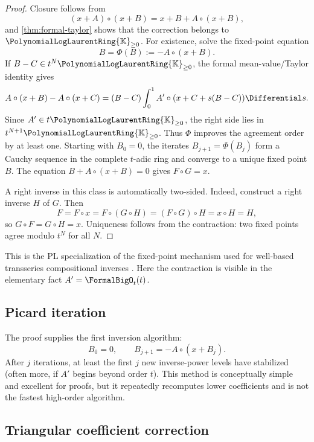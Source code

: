 \documentclass[11pt,oneside]{article}
\numberwithin{equation}{section}
\theoremstyle{definition}
\newcommand{\K}{\mathbb{K}}
\newcommand{\PL}{\PolynomialLogLaurentRing{\K}}
\begin{document}
\begin{proof}
Closure follows from
\[
  (x+A)\circ(x+B)=x+B+A\circ(x+B),
\]
and \cref{thm:formal-taylor} shows that the correction belongs to
\(\PL_{\ge0}\).  For existence, solve the fixed-point equation
\begin{equation}\label{eq:fixed-point-B}
  B=\Phi(B):=-A\circ(x+B).
\end{equation}
If \(B-C\in t^N\PL_{\ge0}\), the formal mean-value/Taylor identity gives
\[
  A\circ(x+B)-A\circ(x+C)
  =(B-C)\int_0^1 A'\circ(x+C+s(B-C))\Differential s.
\]
Since \(A'\in t\PL_{\ge0}\), the right side lies in
\(t^{N+1}\PL_{\ge0}\).  Thus \(\Phi\) improves the agreement order by at least
one.  Starting with \(B_0=0\), the iterates
\(B_{j+1}=\Phi(B_j)\) form a Cauchy sequence in the complete \(t\)-adic ring and
converge to a unique fixed point \(B\).  The equation
\(B+A\circ(x+B)=0\) gives \(F\circ G=x\).

A right inverse in this class is automatically two-sided.  Indeed, construct a
right inverse \(H\) of \(G\).  Then
\[
  F=F\circ x=F\circ(G\circ H)=(F\circ G)\circ H=x\circ H=H,
\]
so \(G\circ F=G\circ H=x\).  Uniqueness follows from the contraction: two fixed
points agree modulo \(t^N\) for all \(N\).
\end{proof}

This is the PL specialization of the fixed-point mechanism used for
well-based transseries compositional inverses \cite{EdgarComposition}.  Here the
contraction is visible in the elementary fact \(A'=\FormalBigO_t(t)\).

\subsection{Picard iteration}

The proof supplies the first inversion algorithm:
\begin{equation}\label{eq:picard-reversion}
  B_0=0,
  \qquad B_{j+1}=-A\circ(x+B_j).
\end{equation}
After \(j\) iterations, at least the first \(j\) new inverse-power levels have
stabilized (often more, if \(A'\) begins beyond order \(t\)).  This method is
conceptually simple and excellent for proofs, but it repeatedly recomputes lower
coefficients and is not the fastest high-order algorithm.

\subsection{Triangular coefficient correction}
\end{document}
